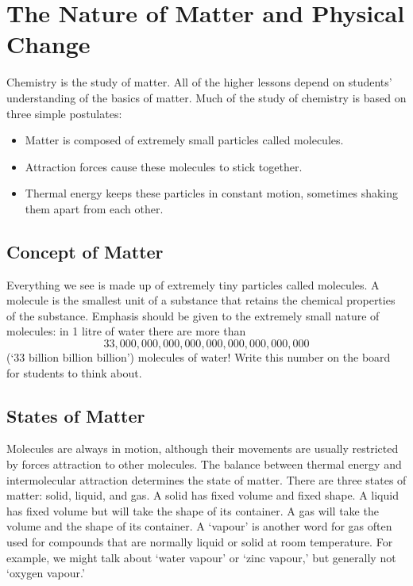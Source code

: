 \chapter{The Nature of Matter and Physical Change}

Chemistry is the study of matter. All of the higher lessons depend on students' understanding of the basics of matter. Much of the study of chemistry is based on three simple postulates:
\begin{itemize}
\item{Matter is composed of extremely small particles called molecules.}
\item{Attraction forces cause these molecules to stick together.}
\item{Thermal energy keeps these particles in constant motion, sometimes shaking them apart from each other.}
\end{itemize}


\section{Concept of Matter}

Everything we see is made up of extremely tiny particles called molecules. A molecule is the smallest unit of a substance that retains the chemical properties of the substance. Emphasis should be given to the extremely small nature of molecules: in 1 litre of water there are more than $$33,000,000,000,000,000,000,000,000,000$$ (`33 billion billion billion') molecules of water! Write this number on the board for students to think about.


\section{States of Matter}

Molecules are always in motion, although their movements are usually restricted by forces attraction to other molecules. The balance between thermal energy and intermolecular attraction determines the state of matter.
There are three states of matter: solid, liquid, and gas. A solid has fixed volume and fixed shape. A liquid has fixed volume but will take the shape of its container. A gas will take the volume and the shape of its container. A `vapour' is another word for gas often used for compounds that are normally liquid or solid at room temperature. For example, we might talk about `water vapour' or `zinc vapour,' but generally not `oxygen vapour.'


